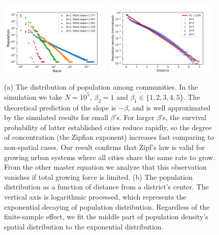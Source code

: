 \documentclass[reprint,unsortedaddress,amsmath,amssymb,aps,prl,showkeys]{revtex4-2}
\begin{document}
\begin{figure}[t]
    \centering
    \includegraphics[width=0.48\textwidth]{pics/zipf.pdf}
    \includegraphics[width=0.48\textwidth]{pics/kernal_density.pdf}
    \caption{(a) The distribution of population among communities. In the simulation we take $N = 10^5$, $\beta_2=1$ and $\beta_1 \in\{1,2,3,4,5\}$. The theoretical prediction of the slope is $-\beta$, and is well approximated by the simulated results for small $\beta$'s. For larger $\beta$'s, the survival probability of latter established cities reduce rapidly, so the degree of concentration (the Zipfian exponent) increases fast comparing to non-spatial cases. Our result confirms that Zipf's law is valid for growing urban systems where all cities share the same rate to grow. From the other master equation we analyze that this observation vanishes if total growing force is limited. (b) The population distribution as a function of distance from a district's center. The vertical axis is logarithmic processed, which represents the exponential decaying of population distribution. Regardless of the finite-sample effect, we fit the middle part of population density's spatial distribution to the exponential distribution.}
    \label{fig:rankditribution}
    \label{fig:clark}
\end{figure}




\end{document}
